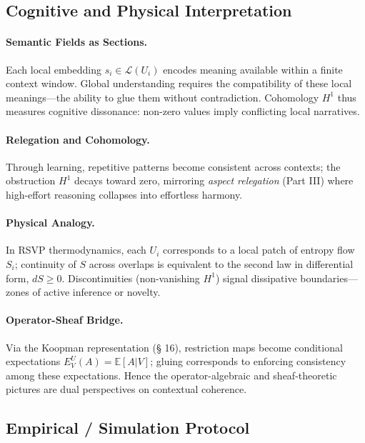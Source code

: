\documentclass[12pt,a4paper,twoside,openright]{book}
\begin{document}
\subsection*{Cognitive and Physical Interpretation}

\paragraph{Semantic Fields as Sections.}
Each local embedding \(s_i\in\mathcal{L}(U_i)\) encodes meaning available within a finite context window.  
Global understanding requires the compatibility of these local meanings---the ability to glue them without contradiction.  
Cohomology \(H^1\) thus measures cognitive dissonance: non-zero values imply conflicting local narratives.

\paragraph{Relegation and Cohomology.}
Through learning, repetitive patterns become consistent across contexts; the obstruction \(H^1\) decays toward zero, mirroring \emph{aspect relegation} (Part III) where high-effort reasoning collapses into effortless harmony.

\paragraph{Physical Analogy.}
In RSVP thermodynamics, each \(U_i\) corresponds to a local patch of entropy flow \(S_i\); continuity of $S$ across overlaps is equivalent to the second law in differential form, \(dS\ge0\).  
Discontinuities (non-vanishing \(H^1\)) signal dissipative boundaries---zones of active inference or novelty.

\paragraph{Operator-Sheaf Bridge.}
Via the Koopman representation (§ 16), restriction maps become conditional expectations \(E_V^U(A)=\mathbb{E}[A|V]\); gluing corresponds to enforcing consistency among these expectations.  
Hence the operator-algebraic and sheaf-theoretic pictures are dual perspectives on contextual coherence.

\subsection*{Empirical / Simulation Protocol}
\end{document}

